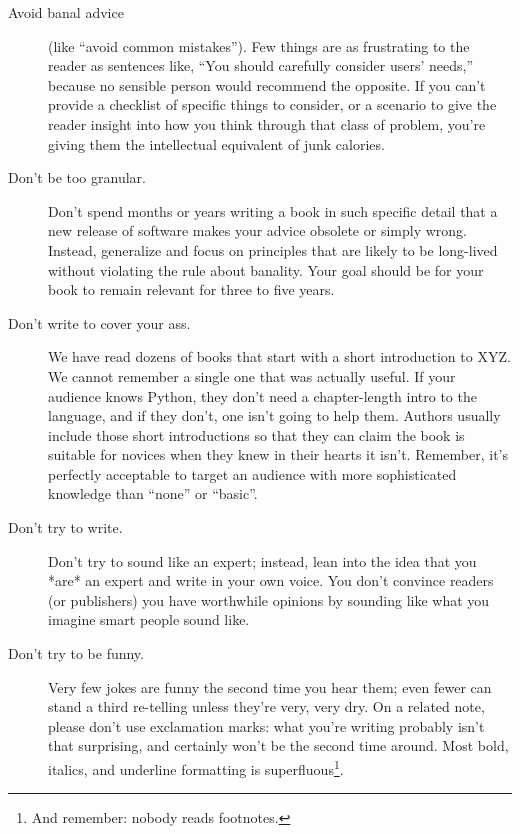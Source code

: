 \documentclass[10pt,letterpaper]{article}
\begin{document}
\begin{description}

\item[Avoid banal advice] (like ``avoid common mistakes'').
    Few things are as frustrating to the reader as sentences like,
    ``You should carefully consider users' needs,''
    because no sensible person would recommend the opposite.
    If you can't provide a checklist of specific things to consider,
    or a scenario to give the reader insight into how you think through that class of problem,
    you're giving them the intellectual equivalent of junk calories.

\item[Don't be too granular.]
    Don't spend months or years writing a book in such specific detail
    that a new release of software makes your advice obsolete or simply wrong.
    Instead, generalize and focus on principles that are likely to be long-lived
    without violating the rule about banality.
    Your goal should be for your book to remain relevant for three to five years.

\item[Don't write to cover your ass.]
    We have read dozens of books that start with a short introduction to XYZ.
    We cannot remember a single one that was actually useful.
    If your audience knows Python,
    they don't need a chapter-length intro to the language,
    and if they don't,
    one isn't going to help them.
    Authors usually include those short introductions
    so that they can claim the book is suitable for novices
    when they knew in their hearts it isn't.
    Remember,
    it's perfectly acceptable to target an audience with more sophisticated knowledge
    than ``none'' or ``basic''.
    
\item[Don't try to write.]
    Don't try to sound like an expert;
    instead,
    lean into the idea that you *are* an expert and write in your own voice.
    You don't convince readers (or publishers) you have worthwhile opinions
    by sounding like what you imagine smart people sound like.
    
\item[Don't try to be funny.]
    Very few jokes are funny the second time you hear them;
    even fewer can stand a third re-telling unless they're very, very dry.
    On a related note,
    please don't use exclamation marks:
    what you're writing probably isn't that surprising,
    and certainly won't be the second time around.
    Most bold, italics, and underline formatting is
    superfluous\footnote{And remember: nobody reads footnotes.}.

\end{description}
\end{document}
